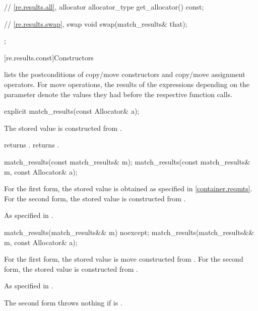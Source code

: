 \begin{codeblock}
{{    // \ref{re.results.all}, allocator
    allocator_type get_allocator() const;

    // \ref{re.results.swap}, swap
    void swap(match_results& that);
  };
}
\end{codeblock}

[re.results.const]{Constructors}

\pnum
{} lists the postconditions of
 copy/move constructors and copy/move assignment operators.
For move operations,
the results of the expressions depending on the parameter  denote
the values they had before the respective function calls.

%
\begin{itemdecl}
explicit match_results(const Allocator& a);
\end{itemdecl}

\begin{itemdescr}
\pnum
\effects
The stored  value is constructed from .

\pnum
\ensures
{} returns .
 returns .
\end{itemdescr}

%
\begin{itemdecl}
match_results(const match_results& m);
match_results(const match_results& m, const Allocator& a);
\end{itemdecl}

\begin{itemdescr}
\pnum
\effects
For the first form,
the stored  value is obtained
as specified in \ref{container.reqmts}.
For the second form,
the stored  value is constructed from .

\pnum
\ensures
As specified in .
\end{itemdescr}

%
\begin{itemdecl}
match_results(match_results&& m) noexcept;
match_results(match_results&& m, const Allocator& a);
\end{itemdecl}

\begin{itemdescr}
\pnum
\effects
For the first form,
the stored  value is move constructed from .
For the second form,
the stored  value is constructed from .

\pnum
\ensures
As specified in .

\pnum
\throws
The second form throws nothing if
 is .
\end{itemdescr}

